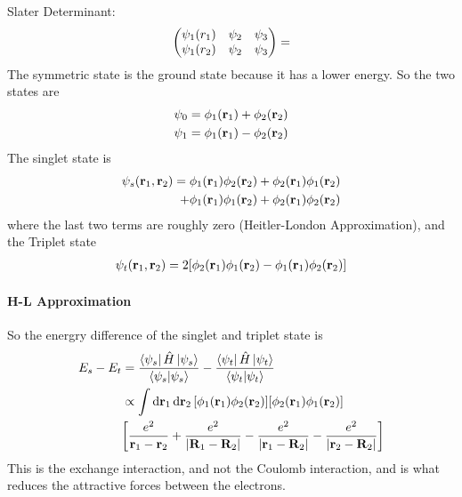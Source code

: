 \documentclass[../main.tex]{subfiles}
\begin{document}
Slater Determinant: 
\begin{align*}
    \mqty(\psi_1(r_1) & \psi_2 & \psi_3 \\ \psi_1(r_2) & \psi_2 & \psi_3) = 
\end{align*}
The symmetric state is the ground state because it has a lower energy. So the two states are
\begin{align*}
    \psi_0 &= \phi_1 (\vb r_1) + \phi_2 (\vb r_2) \\
    \psi_1 &= \phi_1 (\vb r_1) - \phi_2 (\vb r_2)
\end{align*}
The singlet state is
\begin{align*}
    \psi_s(\vb r_1, \vb r_2) = \phi_1 (\vb r_1) \phi_2 (\vb r_2) + \phi_2 (\vb r_1) \phi_1 (\vb r_2) \\
    + \phi_1 (\vb r_1) \phi_1 (\vb r_2) + \phi_2 (\vb r_1) \phi_2 (\vb r_2)
\end{align*}
where the last two terms are roughly zero (Heitler-London Approximation), and the Triplet state
\begin{align*}
    \psi_t(\vb r_1, \vb r_2) = 2 [ \phi_2 (\vb r_1) \phi_1 (\vb r_2) - \phi_1 (\vb r_1) \phi_2(\vb r_2)]
\end{align*}

\newpage
{}
\paragraph*{H-L Approximation} 
So the energry difference of the singlet and triplet state is
\begin{align*}
    E_s - E_t &= \frac{\bra{\psi_s} \hat H \ket{\psi_s}}{\braket{\psi_s} }
     - \frac{\bra{\psi_t} \hat H \ket{\psi_t}}{\braket{\psi_t}} \\
    &\propto \int \dd{\vb r_1} \dd{\vb r_2} [\phi_1 (\vb r_1) \phi_2(\vb r_2)]
    [\phi_2(\vb r_1) \phi_1(\vb r_2)] \\
    &\qt[
        \frac{e^2}{\vb r_1 - \vb r_2} + \frac{e^2}{\abs{\vb R_1 - \vb R_2}} 
        - \frac{e^2}{\abs{\vb r_1 - \vb R_2}} - \frac{e^2}{\abs{\vb r_2 - \vb R_2}} 
    ]
\end{align*}
This is the exchange interaction, and not the Coulomb interaction, and is what reduces the
attractive forces between the electrons. 
\end{document}
